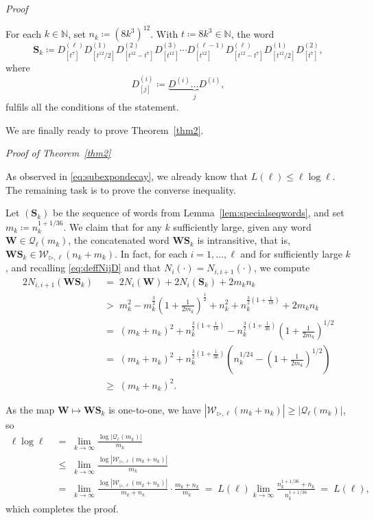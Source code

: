 \documentclass[reqno,a4paper,11pt]{amsart}
\makeatletter
\newcommand{\btt}{\triangleright}
\theoremstyle{remark}
\newcommand{\mc}[1]{{\mathcal #1}}
\newcommand{\mb}[1]{{\mathbf #1}}
\newcommand{\bb}[1]{{\mathbb #1}}
\numberwithin{equation}{section}
\renewenvironment{proof}[1][Proof]{\par
\pushQED{\qed}%
\normalfont \topsep6\p@\@plus6\p@\relax
\trivlist
\item\relax
{\itshape
#1\@addpunct{.}}\hspace\labelsep\ignorespaces
}{%
\popQED\endtrivlist\@endpefalse
}
\makeatother
\begin{document}
    \begin{proof}
            For each $k\in \bb N$, set $n_k\coloneqq (8k^3)^{12}$. With $t\coloneqq 8k^3\in \bb N$, the word 
            \[
                \mb S_k \coloneqq D^{(\ell)}_{[t^7]}D^{(1)}_{[t^{12}/2]}D^{(2)}_{[t^{12}-t^7]}D^{(3)}_{[t^{12}]}\cdots D^{(\ell-1)}_{[t^{12}]}D^{(\ell)}_{[t^{12}-t^7]}D^{(1)}_{[t^{12}/2]}D^{(2)}_{[t^7]},
            \]
            where 
            \[
                D^{(i)}_{[j]}\coloneqq \underbrace{D^{(i)}\dots D^{(i)}}_{j},
            \]
            fulfils all the conditions of the statement.
    \end{proof}

    We are finally ready to prove Theorem~\ref{thm2}.

    \begin{proof}[Proof of Theorem~\ref{thm2}]

As observed in \eqref{eq:subexpondecay}, we already know that $L(\ell)\le \ell\log\ell$. The remaining task is to prove the converse inequality.
        
Let $(\mb S_k)$ be the sequence of words from Lemma~\ref{lem:specialseqwords}, and set $m_k\coloneqq n_k^{1+1/36}$. We claim that for any $k$ sufficiently large, given any word $\mb W \in \mc Q_\ell(m_k)$, the concatenated word $\mb W\mb S_k$ is intransitive, that is, $\mb W\mb S_k\in \mc W_{\btt, \ell}(n_k+m_k)$. In fact, for each $i=1,\dots, \ell$ and for sufficiently large $k$, and recalling \eqref{eq:deffNijD} and that $N_i(\cdot)=N_{i,i+1}(\cdot)$, we compute
        \begin{align*}
            2N_{i, i+1}(\mb W \mb S_k) &\;=\; 2N_{i}(\mb W)+2N_{i}(\mb S_k)+2m_kn_k\\
            &\; > \; m_k^2-m_k^{\frac{3}{2}}\left(1+\frac{1}{2m_k}\right)^{\frac{1}{2}}+n_k^2+n_k^{\frac{3}{2}(1+\frac{1}{18})}+2m_kn_k\\
            &\; = \; (m_k+n_k)^2+n_k^{\frac{3}{2}(1+\frac{1}{18})}-n_k^{\frac{3}{2}(1+\frac{1}{36})}\left(1+\frac{1}{2m_k}\right)^{1/2}\\
            &\; = \; (m_k+n_k)^2 + n_k^{\frac{3}{2}(1+\frac{1}{36})}\left(n_k^{1/24}-\left(1+\frac{1}{2m_k}\right)^{1/2} \right)\\
            &\; \ge \; (m_k+n_k)^2.
        \end{align*}
    
As the map $\mb W \mapsto \mb W\mb  S_k$ is one-to-one, we have $|\mc W_{\btt, \ell}(m_k+n_k)|\ge|\mc Q_{\ell}(m_k)|$, so
        \begin{align*}
            \ell\log\ell&\;=\;\lim_{k\to\infty}\frac{\log|\mc Q_{\ell}(m_k)|}{m_k}\\
            &\;\le\; \lim_{k\to\infty} \frac{\log|\mc W_{\btt, \ell}(m_k+n_k)|}{m_k}\\
            &\;=\; \lim_{k\to\infty} \frac{\log|\mc W_{\btt, \ell}(m_k+n_k)|}{m_k+n_k}\cdot \frac{m_k+n_k}{m_k}
            \;=\; L(\ell)\lim_{k\to\infty}\frac{n_k^{1+1/36}+n_k}{n_k^{1+1/36}}
            \;=\; L(\ell),
        \end{align*}
        which completes the proof.
    \end{proof}

    
    
\end{document}
